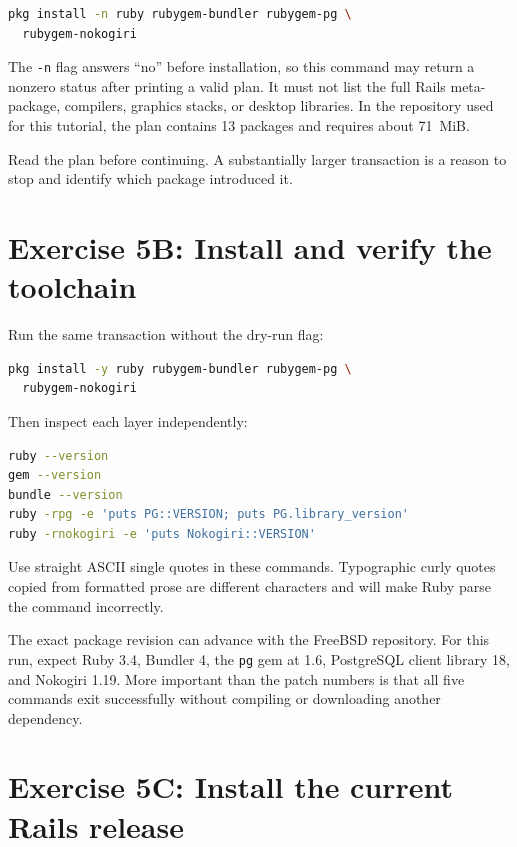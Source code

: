 \begin{lstlisting}[language=sh]
pkg install -n ruby rubygem-bundler rubygem-pg \
  rubygem-nokogiri
\end{lstlisting}

The \texttt{-n} flag answers ``no'' before installation, so this command may
return a nonzero status after printing a valid plan. It must not list the full
Rails meta-package, compilers, graphics stacks, or desktop libraries. In the
repository used for this tutorial, the plan contains 13 packages and requires
about 71~MiB.

Read the plan before continuing. A substantially larger transaction is a
reason to stop and identify which package introduced it.

\section{Exercise 5B: Install and verify the toolchain}

Run the same transaction without the dry-run flag:

\begin{lstlisting}[language=sh]
pkg install -y ruby rubygem-bundler rubygem-pg \
  rubygem-nokogiri
\end{lstlisting}

Then inspect each layer independently:

\begin{lstlisting}[language=sh]
ruby --version
gem --version
bundle --version
ruby -rpg -e 'puts PG::VERSION; puts PG.library_version'
ruby -rnokogiri -e 'puts Nokogiri::VERSION'
\end{lstlisting}

Use straight ASCII single quotes in these commands. Typographic curly quotes
copied from formatted prose are different characters and will make Ruby parse
the command incorrectly.

The exact package revision can advance with the FreeBSD repository. For this
run, expect Ruby 3.4, Bundler 4, the \texttt{pg} gem at 1.6, PostgreSQL client
library 18, and Nokogiri 1.19. More important than the patch numbers is that
all five commands exit successfully without compiling or downloading another
dependency.

\section{Exercise 5C: Install the current Rails release}


